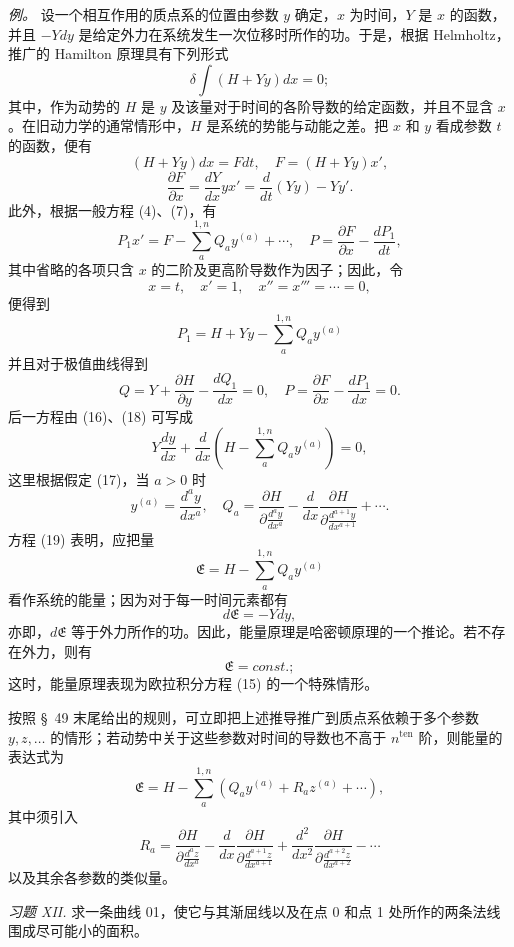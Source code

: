 \documentclass[11pt,a4paper,leqno]{article}
\begin{document}
\emph{例。} 设一个相互作用的质点系的位置由参数 $y$ 确定，$x$ 为时间，$Y$ 是 $x$ 的函数，并且 $-Ydy$ 是给定外力在系统发生一次位移时所作的功。于是，根据 Helmholtz，推广的 Hamilton 原理具有下列形式
\[
\delta\int(H+Yy)dx=0;
\]
其中，作为动势的 $H$ 是 $y$ 及该量对于时间的各阶导数的给定函数，并且不显含 $x$。在旧动力学的通常情形中，$H$ 是系统的势能与动能之差。把 $x$ 和 $y$ 看成参数 $t$ 的函数，便有
\[
(H+Yy)dx=Fdt,\quad F=(H+Yy)x',
\]
\begin{equation}\tag{16}
\frac{\partial F}{\partial x}=\frac{dY}{dx}yx'=\frac{d}{dt}(Yy)-Yy'.
\end{equation}
此外，根据一般方程 (4)、(7)，有
\[
P_1x'=F-\sum_a^{1,n}Q_ay^{(a)}+\cdots,\quad
P=\frac{\partial F}{\partial x}-\frac{dP_1}{dt},
\]
其中省略的各项只含 $x$ 的二阶及更高阶导数作为因子；因此，令
\begin{equation}\tag{17}
x=t,\quad x'=1,\quad x''=x'''=\cdots=0,
\end{equation}
便得到
\begin{equation}\tag{18}
P_1=H+Yy-\sum_a^{1,n}Q_ay^{(a)}
\end{equation}
并且对于极值曲线得到
\[
Q=Y+\frac{\partial H}{\partial y}-\frac{dQ_1}{dx}=0,
\quad
P=\frac{\partial F}{\partial x}-\frac{dP_1}{dx}=0.
\]
后一方程由 (16)、(18) 可写成
\begin{equation}\tag{19}
Y\frac{dy}{dx}+\frac{d}{dx}\left(H-\sum_a^{1,n}Q_ay^{(a)}\right)=0,
\end{equation}
这里根据假定 (17)，当 $a>0$ 时
\[
y^{(a)}=\frac{d^ay}{dx^a},\quad
Q_a=\frac{\partial H}{\partial\frac{d^ay}{dx^a}}-\frac{d}{dx}\frac{\partial H}{\partial\frac{d^{a+1}y}{dx^{a+1}}}+\cdots.
\]
方程 (19) 表明，应把量
\[
\mathfrak E=H-\sum_a^{1,n}Q_ay^{(a)}
\]
看作系统的能量；因为对于每一时间元素都有
\[
d\mathfrak E=-Ydy,
\]
亦即，$d\mathfrak E$ 等于外力所作的功。因此，能量原理是哈密顿原理的一个推论。若不存在外力，则有
\[
\mathfrak E=const.;
\]
这时，能量原理表现为欧拉积分方程 (15) 的一个特殊情形。

按照 \S~49 末尾给出的规则，可立即把上述推导推广到质点系依赖于多个参数 $y,z,\ldots$ 的情形；若动势中关于这些参数对时间的导数也不高于 $n^{\mathrm{ten}}$ 阶，则能量的表达式为
\[
\mathfrak E=H-\sum_a^{1,n}(Q_ay^{(a)}+R_az^{(a)}+\cdots),
\]
其中须引入
\[
R_a=\frac{\partial H}{\partial\frac{d^az}{dx^a}}-\frac{d}{dx}\frac{\partial H}{\partial\frac{d^{a+1}z}{dx^{a+1}}}+\frac{d^2}{dx^2}\frac{\partial H}{\partial\frac{d^{a+2}z}{dx^{a+2}}}-\cdots
\]
以及其余各参数的类似量。

\emph{习题 XII.} 求一条曲线 01，使它与其渐屈线以及在点 0 和点 1 处所作的两条法线围成尽可能小的面积。
\end{document}
